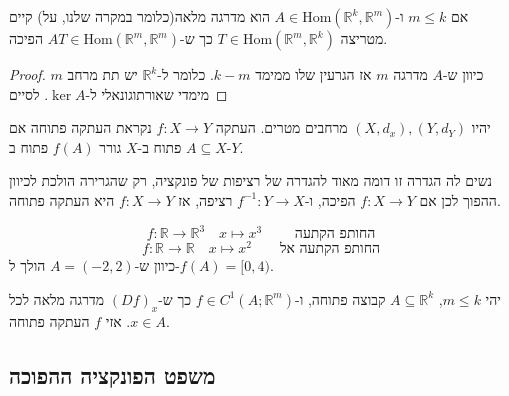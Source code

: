 \documentclass{tstextbook}
\begin{document}
\begin{lemma}
אם \(m\leq k\) ו-\(A\in\mathrm{Hom}\left( \mathbb{R}^k,\mathbb{R}^m \right)\) הוא מדרגה מלאה(כלומר במקרה שלנו, על) קיים מטריצה \(T\in\mathrm{Hom}\left( \mathbb{R}^m,\mathbb{R}^k \right)\) כך ש-\(AT\in\mathrm{Hom}\left( \mathbb{R}^m,\mathbb{R}^m \right)\) הפיכה.

\end{lemma}
\begin{proof}
כיוון ש-\(A\) מדרגה \(m\) אז הגרעין שלו ממימד \(k-m\). כלומר ל-\(\mathbb{R}^k\) יש תת מרחב \(m\) מימדי שאורתוגונאלי ל-\(\ker A\).
לסיים

\end{proof}
\begin{definition}
יהיו \((X,d_{x}),(Y,d_{Y})\) מרחבים מטרים. העתקה \(f:X\to Y\) נקראת העתקה פתוחה
אם \(A\subseteq X\) פתוח ב-\(X\) גורר \(f(A)\) פתוח ב-\(Y\).

\end{definition}
\begin{remark}
נשים לה הגדרה זו דומה מאוד להגדרה של רציפות של פונקציה, רק שהגרירה הולכת לכיוון ההפוך לכן אם \(f:X\to Y\) הפיכה, ו-\(f^{-1}:Y\to X\) רציפה, אז \(f:X\to Y\) היא העתקה פתוחה.

\end{remark}
\begin{example}
$$f:\mathbb{R}\to \mathbb{R}^3\quad x\mapsto x^3\qquad  \text{ החותפ הקתעה}$$$$f:\mathbb{R}\to\mathbb{R}\quad x\mapsto x^2 \qquad \text{החותפ הקתעה אל}$$
כיוון ש-\(A=(-2,2)\) הולך ל-\(f(A)=[0,4)\).

\end{example}
\begin{theorem}
יהי \(m\leq k\), \(A\subseteq \mathbb{R}^k\) קבוצה פתוחה, ו-\(f\in C^1\left( A;\mathbb{R}^m \right)\) כך ש-\((Df)_{x}\) מדרגה מלאה לכל \(x \in A\). אזי \(f\) העתקה פתוחה.

\end{theorem}
\subsection{משפט הפונקציה ההפוכה}
\end{document}
